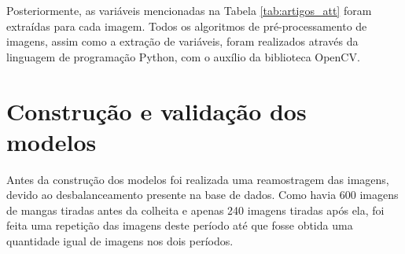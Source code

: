 \begin{figure}[!htb]
\end{figure}

Posteriormente, as variáveis mencionadas na Tabela \ref{tab:artigos_att} foram extraídas para cada imagem. Todos os algoritmos de pré-processamento de imagens, assim como a extração de variáveis, foram realizados através da linguagem de programação Python, com o auxílio da biblioteca OpenCV.

\section{Construção e validação dos modelos}

Antes da construção dos modelos foi realizada uma reamostragem das imagens, devido ao desbalanceamento presente na base de dados. Como havia 600 imagens de mangas tiradas antes da colheita e apenas 240 imagens tiradas após ela, foi feita uma repetição das imagens deste período até que fosse obtida uma quantidade igual de imagens nos dois períodos.

